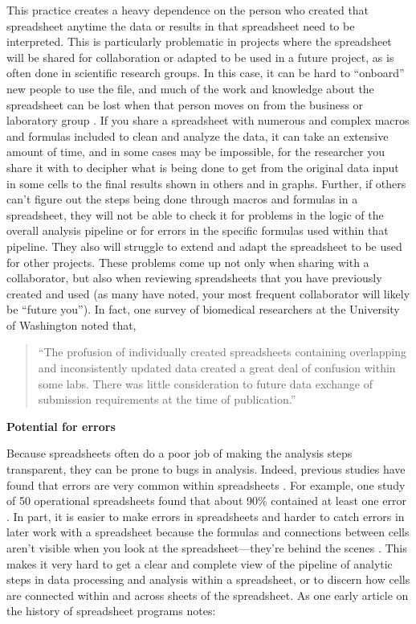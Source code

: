 \documentclass[]{tufte-book}
\begin{document}
This practice creates a heavy dependence on the person who created that
spreadsheet anytime the data or results in that spreadsheet need to be
interpreted. This is particularly problematic in projects where the spreadsheet
will be shared for collaboration or adapted to be used in a future project, as
is often done in scientific research groups. In this case, it
can be hard to ``onboard'' new people to use the file, and much of the work and
knowledge about the spreadsheet can be lost when that person moves on from the
business or laboratory group \citep{creeth1985microcomputer, myneni2010organization}. If you share a spreadsheet with numerous and complex
macros and formulas included to clean and analyze the data, it can take an
extensive amount of time, and in some cases may be impossible, for the
researcher you share it with to decipher what is being done to get from the
original data input in some cells to the final results shown in others and in
graphs. Further, if others can't figure out the steps being done through macros
and formulas in a spreadsheet, they will not be able to check it for problems in
the logic of the overall analysis pipeline or for errors in the specific
formulas used within that pipeline. They also will struggle to extend and adapt
the spreadsheet to be used for other projects. These problems come up not only
when sharing with a collaborator, but also when reviewing spreadsheets that you
have previously created and used (as many have noted, your most frequent
collaborator will likely be ``future you''). In fact, one survey of biomedical
researchers at the University of Washington noted that,

\begin{quote}
``The profusion of individually created spreadsheets containing overlapping and
inconsistently updated data created a great deal of confusion within some labs.
There was little consideration to future data exchange of submission
requirements at the time of publication.''
\citep{anderson2007issues}
\end{quote}

\textbf{Potential for errors}

Because spreadsheets often do a poor job of making the analysis steps
transparent, they can be prone to bugs in analysis. Indeed, previous studies
have found that errors are very common within spreadsheets
\citep{hermans2016spreadsheets}. For example, one study of 50 operational
spreadsheets found that about 90\% contained at least one error
\citep{powell2009errors}. In part, it is easier to make errors in spreadsheets and
harder to catch errors in later work with a spreadsheet because the formulas and
connections between cells aren't visible when you look at the
spreadsheet---they're behind the scenes \citep{birch2018future}. This makes it very
hard to get a clear and complete view of the pipeline of analytic steps in data
processing and analysis within a spreadsheet, or to discern how cells are
connected within and across sheets of the spreadsheet. As one early article on
the history of spreadsheet programs notes:
\end{document}
